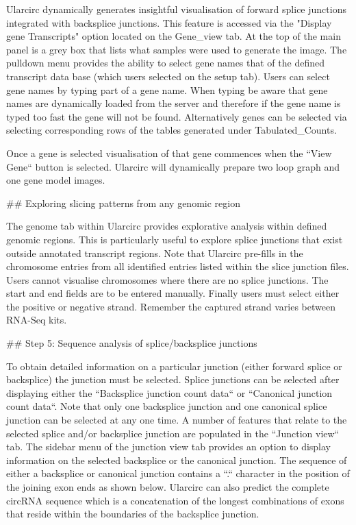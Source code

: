 Ularcirc dynamically generates insightful visualisation of forward splice junctions integrated with backsplice junctions. This feature is accessed via the "Display gene Transcripts" option located on the Gene_view tab. At the top of the main panel is a grey box that lists what samples were used to generate the image. The pulldown menu provides the ability to select gene names that of the defined transcript data base (which users selected on the setup tab). Users can select gene names by typing part of a gene name. When typing  be aware that gene names are dynamically loaded from the server and therefore if the gene name is typed too fast the gene will not be found.  Alternatively genes can be selected via selecting corresponding rows of the tables generated under Tabulated_Counts. 

Once a gene is selected visualisation of that gene commences when the ``View Gene`` button is selected. Ularcirc will dynamically prepare two loop graph and one gene model images.


## Exploring slicing patterns from any genomic region

The genome tab within Ularcirc provides explorative analysis within defined genomic regions. This is particularly useful to explore splice junctions that exist outside annotated transcript regions. Note that Ularcirc pre-fills in the chromosome entries from all identified entries listed within the slice junction files. Users cannot visualise chromosomes where there are no splice junctions. The start and end fields are to be entered manually. Finally users must select either the positive or negative strand. Remember the captured strand varies between RNA-Seq kits.

## Step 5: Sequence analysis of splice/backsplice junctions

To obtain detailed information on a particular junction (either forward splice or backsplice) the junction must be selected. Splice junctions can be selected after displaying either the ``Backsplice junction count data`` or ``Canonical junction count data``. Note that only one backsplice junction and one canonical splice junction can be selected at any one time. A number of features that relate to the selected splice and/or backsplice junction are populated in the ``Junction view`` tab. The sidebar menu of the junction view tab provides an option to display information on the selected backsplice or the canonical junction. The sequence of either a backsplice or canonical junction contains a ``.`` character in the position of the joining exon ends as shown below. Ularcirc can also predict the complete circRNA sequence which is a concatenation of the longest combinations of exons that reside within the boundaries of the backsplice junction. 

